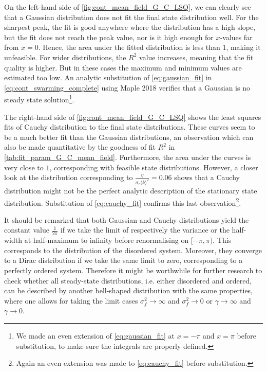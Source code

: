 On the left-hand side of \cref{fig:cont_mean_field_G_C_LSQ}, we can clearly see that a Gaussian distribution does not fit the final state distribution well. For the sharpest peak, the fit is good anywhere where the distribution has a high slope, but the fit does not reach the peak value, nor is it high enough for $x$-values far from $x=0$. Hence, the area under the fitted distribution is less than 1, making it unfeasible. For wider distributions, the $R^2$ value increases, meaning that the fit quality is higher. But in these cases the maximum and minimum values are estimated too low. An analytic substitution of \cref{eq:gaussian_fit} in \cref{eq:cont_swarming_complete} using Maple 2018 verifies that a Gaussian is no steady state solution\footnote{We made an even extension of \cref{eq:gaussian_fit} at $x=-\pi$ and $x=\pi$ before substitution, to make sure the integrals are properly defined.}.

The right-hand side of \cref{fig:cont_mean_field_G_C_LSQ} shows the least squares fits of Cauchy distribution to the final state distributions. These curves seem to be a much better fit than the Gaussian distributions, an observation which can also be made quantitative by the goodness of fit $R^2$ in \cref{tab:fit_param_G_C_mean_field}. Furthermore, the area under the curves is very close to $1$, corresponding with feasible state distributions. However, a closer look at the distribution corresponding to $\frac{\eta}{\sigma_c\langle k \rangle^2} = 0.06$ shows that a Cauchy distribution might not be the perfect analytic description of the stationary state distribution.  Substitution of \cref{eq:cauchy_fit} confirms this last observation\footnote{Again an even extension was made to \cref{eq:cauchy_fit} before substitution.}. 

It should be remarked that both Gaussian and Cauchy distributions yield the constant value $\frac{1}{2\pi}$ if we take the limit of respectively the variance or the half-width at half-maximum to infinity before renormalising on $[-\pi,\pi)$. This corresponds to the distribution of the disordered system. Moreover, they converge to a Dirac distribution if we take the same limit to zero, corresponding to a perfectly ordered system. Therefore it might be worthwhile for further research to check whether all steady-state distributions, i.e. either disordered and ordered, can be described by another bell-shaped distribution with the same properties, where one allows for taking the limit cases $\sigma_f^2 \to \infty$ and $\sigma_f^2 \to 0$ or $\gamma \to \infty$ and $\gamma \to 0$. 

